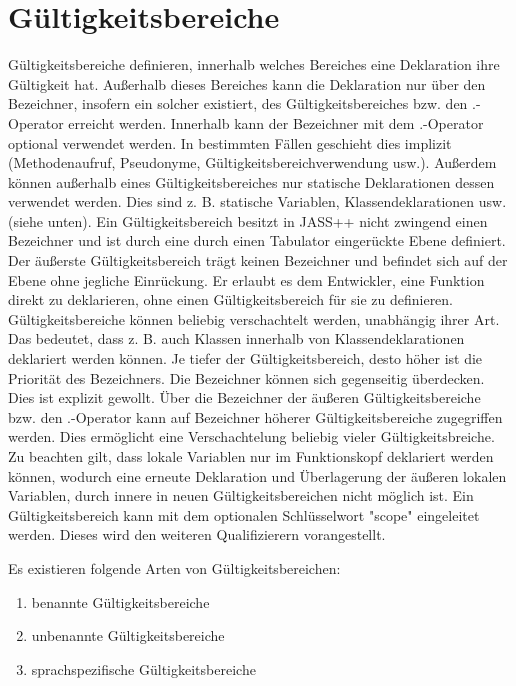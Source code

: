 \chapter{Gültigkeitsbereiche}
Gültigkeitsbereiche definieren, innerhalb welches Bereiches eine Deklaration ihre Gültigkeit hat. Außerhalb dieses Bereiches
kann die Deklaration nur über den Bezeichner, insofern ein solcher existiert, des Gültigkeitsbereiches bzw. den .-Operator erreicht werden.
Innerhalb kann der Bezeichner mit dem .-Operator optional verwendet werden.
In bestimmten Fällen geschieht dies implizit (Methodenaufruf, Pseudonyme, Gültigkeitsbereichverwendung usw.).
Außerdem können außerhalb eines Gültigkeitsbereiches nur statische Deklarationen dessen verwendet werden.
Dies sind z. B. statische Variablen, Klassendeklarationen usw. (siehe unten).
Ein Gültigkeitsbereich besitzt in JASS++ nicht zwingend einen Bezeichner und ist durch eine durch einen Tabulator eingerückte Ebene definiert.
Der äußerste Gültigkeitsbereich trägt keinen Bezeichner und befindet sich auf der Ebene ohne jegliche Einrückung.
Er erlaubt es dem Entwickler, eine Funktion direkt zu deklarieren, ohne einen Gültigkeitsbereich für sie zu definieren.
Gültigkeitsbereiche können beliebig verschachtelt werden, unabhängig ihrer Art. Das bedeutet, dass z. B. auch Klassen innerhalb von
Klassendeklarationen deklariert werden können.
Je tiefer der Gültigkeitsbereich, desto höher ist die Priorität des Bezeichners. Die Bezeichner können sich gegenseitig überdecken.
Dies ist explizit gewollt. Über die Bezeichner der äußeren Gültigkeitsbereiche bzw. den .-Operator kann auf Bezeichner höherer
Gültigkeitsbereiche zugegriffen werden. Dies ermöglicht eine Verschachtelung beliebig vieler Gültigkeitsbreiche.
Zu beachten gilt, dass lokale Variablen nur im Funktionskopf deklariert werden können, wodurch eine erneute Deklaration und Überlagerung
der äußeren lokalen Variablen, durch innere in neuen Gültigkeitsbereichen nicht möglich ist.
Ein Gültigkeitsbereich kann mit dem optionalen Schlüsselwort "scope" eingeleitet werden. Dieses wird den weiteren Qualifizierern vorangestellt.

Es existieren folgende Arten von Gültigkeitsbereichen:
\begin{enumerate}
\item benannte Gültigkeitsbereiche
\item unbenannte Gültigkeitsbereiche
\item sprachspezifische Gültigkeitsbereiche
\end{enumerate}

